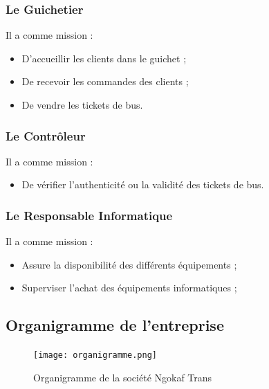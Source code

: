             \subsubsection[Le guichetier]{Le Guichetier}
            Il a comme mission :
            \par
                \begin{itemize}
                    \setlength{\itemsep}{0pt}
                    \item [\ding{226}] D’accueillir les clients dans le guichet  ;
                    \item [\ding{226}] De recevoir les commandes des clients ;
                    \item [\ding{226}] De vendre les tickets de bus.
                \end{itemize}
            \subsubsection[Le Contrôleur]{Le Contrôleur}
            Il a comme mission :
            \par
                \begin{itemize}
                    \setlength{\itemsep}{0pt}
                    \item [\ding{226}] De vérifier l’authenticité ou la validité des tickets de bus.
                \end{itemize}                
            \subsubsection[Le Responsable Informatique]{Le Responsable Informatique}
            Il a comme mission :
            \par
                \begin{itemize}
                    \setlength{\itemsep}{0pt}
                    \item [\ding{226}] Assure la disponibilité des différents équipements ;
                    \item [\ding{226}] Superviser l’achat des équipements informatiques ;
                \end{itemize}
\pagebreak        
        \subsection[Organigramme de l’entreprise]{Organigramme de l’entreprise}
            \begin{figure}[H]
                \centering
                \texttt{[image: organigramme.png]}
                \caption{Organigramme de la société Ngokaf Trans}
                \label{fig:Organigramme}
            \end{figure}
